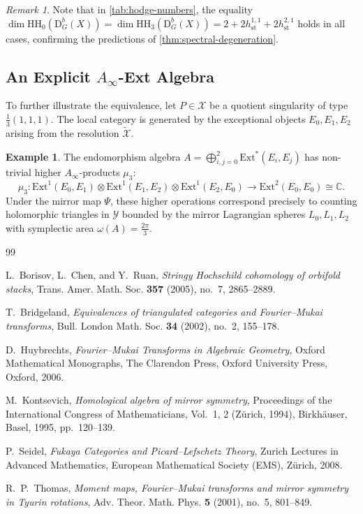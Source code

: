 \documentclass[12pt,reqno]{amsart}
\theoremstyle{plain}
\theoremstyle{definition}
\newtheorem{example}[theorem]{Example}
\theoremstyle{remark}
\newtheorem{remark}[theorem]{Remark}
\newcommand{\cX}{\mathcal{X}}
\newcommand{\cY}{\mathcal{Y}}
\newcommand{\Db}{\mathrm{D}^b}
\newcommand{\Ext}{\mathrm{Ext}}
\newcommand{\HH}{\mathrm{HH}}
\newcommand{\CC}{\mathbb{C}}
\numberwithin{equation}{section}
\begin{document}
\begin{remark}
Note that in \cref{tab:hodge-numbers}, the equality $\dim \HH_0(\Db_G(X)) = \dim \HH_3(\Db_G(X)) = 2 + 2 h^{1,1}_{\mathrm{st}} + 2 h^{2,1}_{\mathrm{st}}$ holds in all cases, confirming the predictions of \cref{thm:spectral-degeneration}.
\end{remark}

\subsection{An Explicit \texorpdfstring{$A_\infty$}{A-infinity}-Ext Algebra}
To further illustrate the equivalence, let $P \in \cX$ be a quotient singularity of type $\frac{1}{3}(1, 1, 1)$. The local category is generated by the exceptional objects $E_0, E_1, E_2$ arising from the resolution $\tilde{\cX}$.

\begin{example}
The endomorphism algebra $A = \bigoplus_{i,j=0}^2 \Ext^*(E_i, E_j)$ has non-trivial higher $A_\infty$-products $\mu_3$:
\begin{equation}
\mu_3 \colon \Ext^1(E_0, E_1) \otimes \Ext^1(E_1, E_2) \otimes \Ext^1(E_2, E_0) \longrightarrow \Ext^2(E_0, E_0) \cong \CC.
\end{equation}
Under the mirror map $\Psi$, these higher operations correspond precisely to counting holomorphic triangles in $\cY$ bounded by the mirror Lagrangian spheres $L_0, L_1, L_2$ with symplectic area $\omega(A) = \frac{2\pi}{3}$.
\end{example}

\begin{thebibliography}{99}

L.~Borisov, L.~Chen, and Y.~Ruan,
\emph{Stringy Hochschild cohomology of orbifold stacks},
Trans. Amer. Math. Soc. \textbf{357} (2005), no.~7, 2865--2889.

T.~Bridgeland,
\emph{Equivalences of triangulated categories and Fourier--Mukai transforms},
Bull. London Math. Soc. \textbf{34} (2002), no.~2, 155--178.

D.~Huybrechts,
\emph{Fourier--Mukai Transforms in Algebraic Geometry},
Oxford Mathematical Monographs, The Clarendon Press, Oxford University Press, Oxford, 2006.

M.~Kontsevich,
\emph{Homological algebra of mirror symmetry},
Proceedings of the International Congress of Mathematicians, Vol.~1, 2 (Z\"urich, 1994), Birkh\"auser, Basel, 1995, pp.~120--139.

P.~Seidel,
\emph{Fukaya Categories and Picard--Lefschetz Theory},
Zurich Lectures in Advanced Mathematics, European Mathematical Society (EMS), Z\"urich, 2008.

R.~P.~Thomas,
\emph{Moment maps, Fourier--Mukai transforms and mirror symmetry in Tyurin rotations},
Adv. Theor. Math. Phys. \textbf{5} (2001), no.~5, 801--849.

\end{thebibliography}
\end{document}
